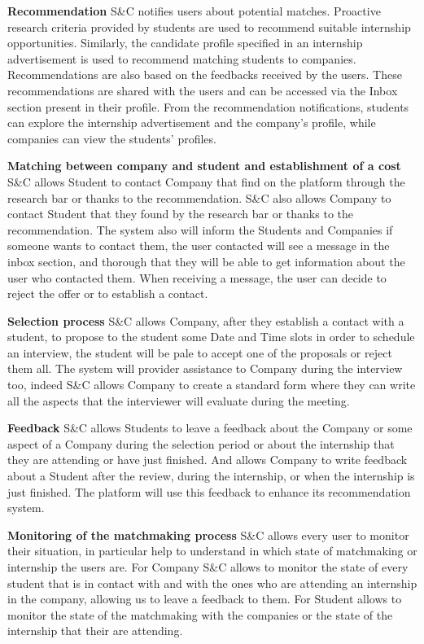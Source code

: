 \textbf{Recommendation}\newline
S\&C notifies users about potential matches. Proactive research criteria provided by students are used to recommend suitable internship opportunities. Similarly, the candidate profile specified in an internship advertisement is used to recommend matching students to companies. Recommendations are also based on the feedbacks received by the users. These recommendations are shared with the users and can be accessed via the Inbox section present in their profile. From the recommendation notifications, students can explore the internship advertisement and the company's profile, while companies can view the students' profiles.

\textbf{Matching between company and student and establishment of a cost }\newline
S\&C allows Student to contact Company that find on the platform through the research bar or thanks to the recommendation. S\&C also allows Company to contact Student that they found by the research bar or thanks to the recommendation. The system also will inform the Students and Companies if someone wants to contact them, the user contacted will see a message in the inbox section, and thorough that they will be able to get information about the user who contacted them. When receiving a message, the user can decide to reject the offer or to establish a contact.

\textbf{Selection process}\newline
S\&C allows Company, after they establish a contact with a student, to propose to the student some Date and Time slots in order to schedule an interview, the student will be pale to accept one of the proposals or reject them all. The system will provider assistance to Company during the interview too, indeed S\&C allows Company to create a standard form where they can write all the aspects that the interviewer will evaluate during the meeting.

\textbf{Feedback}\newline
S\&C allows Students to leave a feedback about the Company or some aspect of a Company during the selection period or about the internship that they are attending or have just finished. And allows Company to write feedback about a Student after the review, during the internship, or when the internship is just finished. The platform will use this feedback to enhance its recommendation system.

\textbf{Monitoring of the matchmaking process}\newline
S\&C allows every user to monitor their situation, in particular help to understand in which state of matchmaking or internship the users are. For Company S\&C allows to monitor the state of every student that is in contact with and with the ones who are attending an internship in the company, allowing us to leave a feedback to them. For Student allows to monitor the state of the matchmaking with the companies or the state of the internship that their are attending.

